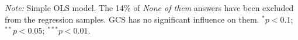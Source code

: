 
\begin{table}[h]
  \caption[Influence of the GCS on electoral prospects]{Preference for a progressive platform depending on whether it includes the GCS or not. (Question \ref{q:conjoint_c}) 
} %
  \makebox[\textwidth][c]{}\label{tab:conjoint_c}
  {\footnotesize \textit{Note:} Simple OLS model. The 14\% of \textit{None of them} answers have been excluded from the regression samples. GCS has no significant influence on them. $^{*}p<0.1$; $^{**} p<0.05$; $^{***} p<0.01$. 
  }
\end{table}
